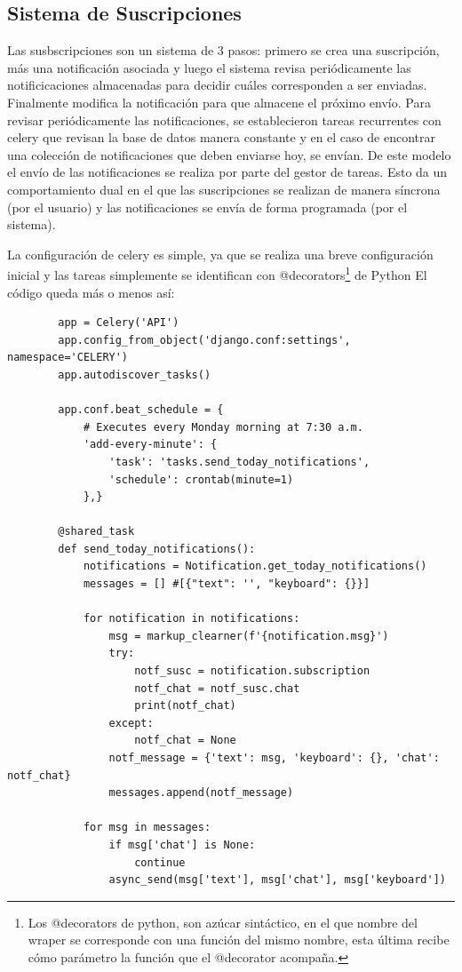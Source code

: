     \subsection{Sistema de Suscripciones}
    \par Las susbscripciones son un sistema de 3 pasos: primero se crea una suscripción, más una notificación asociada y luego el sistema revisa periódicamente las notificicaciones almacenadas para decidir cuáles corresponden a ser enviadas. Finalmente modifica la notificación para que almacene el próximo envío.
    Para revisar periódicamente las notificaciones, se establecieron tareas recurrentes con celery que revisan la base de datos manera constante y en el caso de encontrar una colección de notificaciones que deben enviarse hoy, se envían. 
    De este modelo el envío de las notificaciones se realiza por parte del gestor de tareas.
    Esto da un comportamiento dual en el que las suscripciones se realizan de manera síncrona (por el usuario) y las notificaciones se envía de forma programada (por el sistema).
    \par La configuración de celery es simple, ya que se realiza una breve configuración inicial y las tareas simplemente se identifican con @decorators\footnote{ Los @decorators de python, son azúcar sintáctico, en el que nombre del wraper se corresponde con una función del mismo nombre, esta última recibe cómo parámetro la función que el @decorator acompaña.} de Python  
    El código queda más o menos así:

    \begin{verbatim}
        app = Celery('API')
        app.config_from_object('django.conf:settings', namespace='CELERY')
        app.autodiscover_tasks()

        app.conf.beat_schedule = {
            # Executes every Monday morning at 7:30 a.m.
            'add-every-minute': {
                'task': 'tasks.send_today_notifications',
                'schedule': crontab(minute=1)
            },}

        @shared_task
        def send_today_notifications():
            notifications = Notification.get_today_notifications()
            messages = [] #[{"text": '', "keyboard": {}}]
            
            for notification in notifications:
                msg = markup_clearner(f'{notification.msg}')
                try:
                    notf_susc = notification.subscription
                    notf_chat = notf_susc.chat
                    print(notf_chat)
                except:
                    notf_chat = None
                notf_message = {'text': msg, 'keyboard': {}, 'chat': notf_chat}
                messages.append(notf_message)

            for msg in messages:
                if msg['chat'] is None:
                    continue
                async_send(msg['text'], msg['chat'], msg['keyboard'])
    \end{verbatim}


